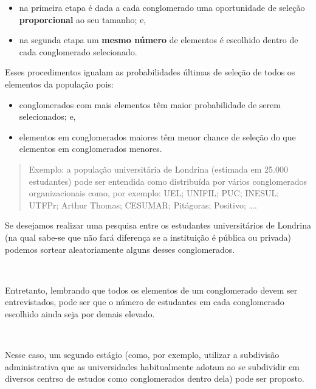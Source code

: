 \documentclass[
]{book}
\providecommand{\tightlist}{%
  \setlength{\itemsep}{0pt}\setlength{\parskip}{0pt}}
\begin{document}
\hfill\break

\begin{itemize}
\tightlist
\item
  na primeira etapa é dada a cada conglomerado uma oportunidade de seleção \textbf{proporcional} ao seu tamanho; e,\\
\item
  na segunda etapa um \textbf{mesmo número} de elementos é escolhido dentro de cada conglomerado selecionado.
\end{itemize}

\hfill\break

Esses procedimentos igualam as probabilidades últimas de seleção de todos os elementos da população pois:

\hfill\break

\begin{itemize}
\tightlist
\item
  conglomerados com mais elementos têm maior probabilidade de serem selecionados; e,
\item
  elementos em conglomerados maiores têm menor chance de seleção do que elementos em conglomerados menores.
\end{itemize}

\hfill\break

\begin{quote}
Exemplo: a população universitária de Londrina (estimada em 25.000 estudantes) pode ser entendida como distribuída por vários conglomerados organizacionais como, por exemplo: UEL; UNIFIL; PUC; INESUL; UTFPr; Arthur Thomas; CESUMAR; Pitágoras; Positivo; \ldots.
\end{quote}

\hfill\break

Se desejamos realizar uma pesquisa entre os estudantes universitários de Londrina (na qual sabe-se que não fará diferença se a instituição é pública ou privada) podemos sortear aleatoriamente alguns desses conglomerados.

~

Entretanto, lembrando que todos os elementos de um conglomerado devem ser entrevistados, pode ser que o número de estudantes em cada conglomerado escolhido ainda seja por demais elevado.

~

Nesse caso, um segundo estágio (como, por exemplo, utilizar a subdivisão administrativa que as universidades habitualmente adotam ao se subdividir em diversos centrso de estudos como conglomerados dentro dela) pode ser proposto.
\end{document}

